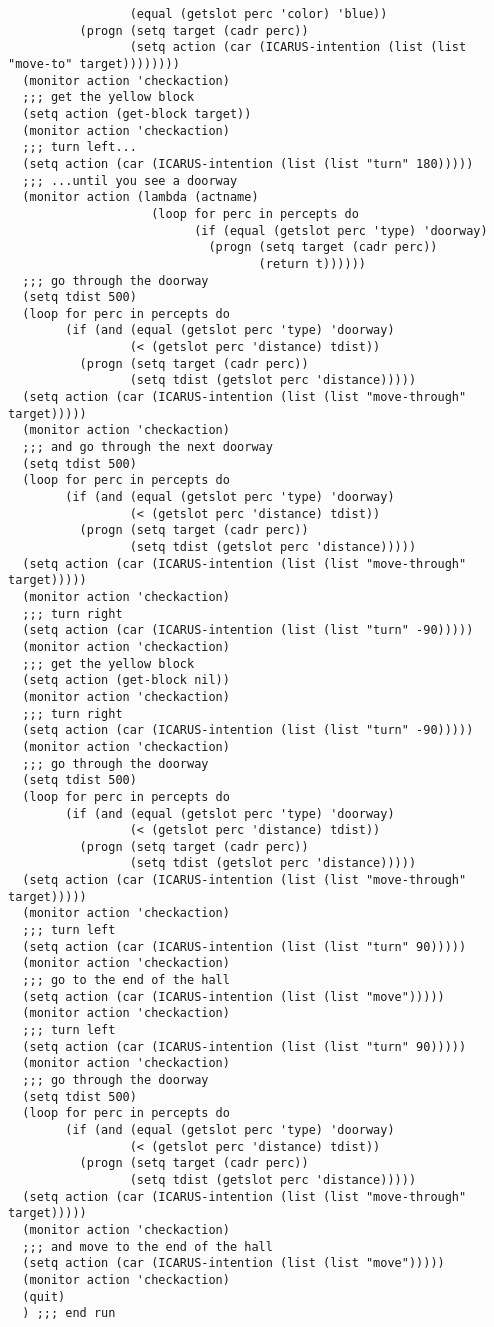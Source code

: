 \documentclass{article}
\begin{document}
\begin{verbatim}
                 (equal (getslot perc 'color) 'blue))
          (progn (setq target (cadr perc))
                 (setq action (car (ICARUS-intention (list (list "move-to" target))))))))
  (monitor action 'checkaction)
  ;;; get the yellow block
  (setq action (get-block target))
  (monitor action 'checkaction)
  ;;; turn left...
  (setq action (car (ICARUS-intention (list (list "turn" 180)))))
  ;;; ...until you see a doorway
  (monitor action (lambda (actname)
                    (loop for perc in percepts do
                          (if (equal (getslot perc 'type) 'doorway)
                            (progn (setq target (cadr perc))
                                   (return t))))))
  ;;; go through the doorway
  (setq tdist 500)
  (loop for perc in percepts do
        (if (and (equal (getslot perc 'type) 'doorway)
                 (< (getslot perc 'distance) tdist))
          (progn (setq target (cadr perc))
                 (setq tdist (getslot perc 'distance)))))
  (setq action (car (ICARUS-intention (list (list "move-through" target)))))
  (monitor action 'checkaction)
  ;;; and go through the next doorway
  (setq tdist 500)
  (loop for perc in percepts do
        (if (and (equal (getslot perc 'type) 'doorway)
                 (< (getslot perc 'distance) tdist))
          (progn (setq target (cadr perc))
                 (setq tdist (getslot perc 'distance)))))
  (setq action (car (ICARUS-intention (list (list "move-through" target)))))
  (monitor action 'checkaction)
  ;;; turn right
  (setq action (car (ICARUS-intention (list (list "turn" -90)))))
  (monitor action 'checkaction)
  ;;; get the yellow block
  (setq action (get-block nil))
  (monitor action 'checkaction)
  ;;; turn right
  (setq action (car (ICARUS-intention (list (list "turn" -90)))))
  (monitor action 'checkaction)
  ;;; go through the doorway
  (setq tdist 500)
  (loop for perc in percepts do
        (if (and (equal (getslot perc 'type) 'doorway)
                 (< (getslot perc 'distance) tdist))
          (progn (setq target (cadr perc))
                 (setq tdist (getslot perc 'distance)))))
  (setq action (car (ICARUS-intention (list (list "move-through" target)))))
  (monitor action 'checkaction)
  ;;; turn left
  (setq action (car (ICARUS-intention (list (list "turn" 90)))))
  (monitor action 'checkaction)
  ;;; go to the end of the hall
  (setq action (car (ICARUS-intention (list (list "move")))))
  (monitor action 'checkaction)
  ;;; turn left
  (setq action (car (ICARUS-intention (list (list "turn" 90)))))
  (monitor action 'checkaction)
  ;;; go through the doorway
  (setq tdist 500)
  (loop for perc in percepts do
        (if (and (equal (getslot perc 'type) 'doorway)
                 (< (getslot perc 'distance) tdist))
          (progn (setq target (cadr perc))
                 (setq tdist (getslot perc 'distance)))))
  (setq action (car (ICARUS-intention (list (list "move-through" target)))))
  (monitor action 'checkaction)
  ;;; and move to the end of the hall
  (setq action (car (ICARUS-intention (list (list "move")))))
  (monitor action 'checkaction)
  (quit)
  ) ;;; end run


\end{verbatim}
\end{document}
